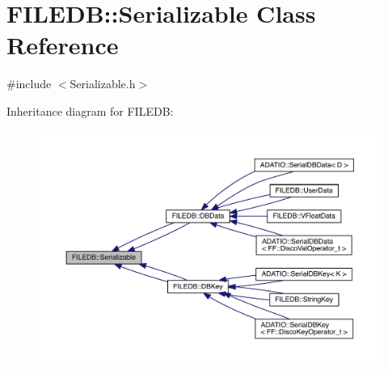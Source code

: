 \hypertarget{classFILEDB_1_1Serializable}{}\section{F\+I\+L\+E\+DB\+:\+:Serializable Class Reference}
\label{classFILEDB_1_1Serializable}


{\ttfamily \#include $<$Serializable.\+h$>$}



Inheritance diagram for F\+I\+L\+E\+DB\+:\nopagebreak
\begin{figure}[H]
\begin{center}
\leavevmode
\includegraphics[width=350pt]{de/dd1/classFILEDB_1_1Serializable__inherit__graph}
\end{center}
\end{figure}
